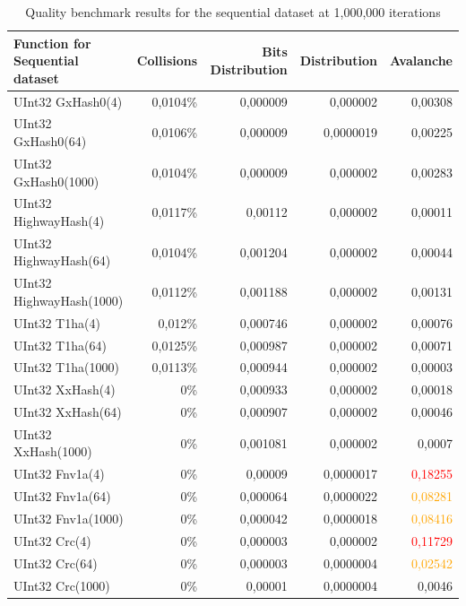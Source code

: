\documentclass[10pt]{article}
\begin{document}
\begin{table}[H]
\centering
\begin{tabular}{|l|r|r|r|r|}
\hline
\textbf{Function for Sequential dataset} & \textbf{Collisions} & \textbf{Bits Distribution} & \textbf{Distribution} & \textbf{Avalanche} \\
\hline
UInt32 GxHash0(4)                & 0,0104\% & 0,000009  & 0,000002 & 0,00308 \\
UInt32 GxHash0(64)               & 0,0106\% & 0,000009  & 0,0000019 & 0,00225 \\
UInt32 GxHash0(1000)             & 0,0104\% & 0,000009  & 0,000002 & 0,00283 \\
UInt32 HighwayHash(4)            & 0,0117\% & 0,00112   & 0,000002 & 0,00011 \\
UInt32 HighwayHash(64)           & 0,0104\% & 0,001204  & 0,000002 & 0,00044 \\
UInt32 HighwayHash(1000)         & 0,0112\% & 0,001188  & 0,000002 & 0,00131 \\
UInt32 T1ha(4)                   & 0,012\%  & 0,000746  & 0,000002 & 0,00076 \\
UInt32 T1ha(64)                  & 0,0125\% & 0,000987  & 0,000002 & 0,00071 \\
UInt32 T1ha(1000)                & 0,0113\% & 0,000944  & 0,000002 & 0,00003 \\
UInt32 XxHash(4)                & 0\%      & 0,000933  & 0,000002 & 0,00018 \\
UInt32 XxHash(64)               & 0\%      & 0,000907  & 0,000002 & 0,00046 \\
UInt32 XxHash(1000)             & 0\%      & 0,001081  & 0,000002 & 0,0007 \\
UInt32 Fnv1a(4)                 & 0\%      & 0,00009   & 0,0000017 & \textcolor{red}{0,18255} \\
UInt32 Fnv1a(64)                & 0\%      & 0,000064  & 0,0000022 & \textcolor{orange}{0,08281} \\
UInt32 Fnv1a(1000)              & 0\%      & 0,000042  & 0,0000018 & \textcolor{orange}{0,08416} \\
UInt32 Crc(4)                   & 0\%      & 0,000003  & 0,000002 & \textcolor{red}{0,11729} \\
UInt32 Crc(64)                  & 0\%      & 0,000003  & 0,0000004 & \textcolor{orange}{0,02542} \\
UInt32 Crc(1000)                & 0\%      & 0,00001   & 0,0000004 & 0,0046 \\
\hline
\end{tabular}
\caption{Quality benchmark results for the sequential dataset at 1,000,000 iterations}
\label{tab:my_label}
\end{table}
\end{document}
